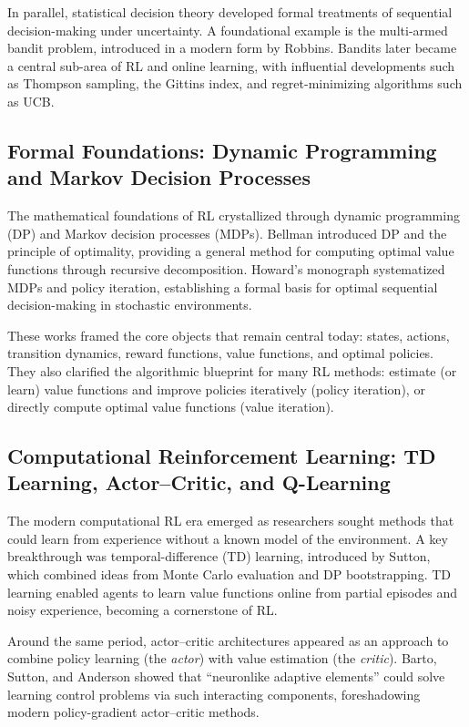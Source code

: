 \documentclass[10pt]{article}
\begin{document}
In parallel, statistical decision theory developed formal treatments of sequential decision-making under uncertainty.
A foundational example is the multi-armed bandit problem, introduced in a modern form by Robbins.\cite{robbins1952sequential}
Bandits later became a central sub-area of RL and online learning, with influential developments such as Thompson sampling,\cite{thompson1933likelihood}
the Gittins index,\cite{gittins1979bandit}
and regret-minimizing algorithms such as UCB.\cite{auer2002finite}

\subsection{Formal Foundations: Dynamic Programming and Markov Decision Processes}

The mathematical foundations of RL crystallized through dynamic programming (DP) and Markov decision processes (MDPs).
Bellman introduced DP and the principle of optimality, providing a general method for computing optimal value functions through recursive decomposition.\cite{bellman1957dynamic}
Howard’s monograph systematized MDPs and policy iteration, establishing a formal basis for optimal sequential decision-making in stochastic environments.\cite{howard1960dynamic}

These works framed the core objects that remain central today: states, actions, transition dynamics, reward functions, value functions, and optimal policies.
They also clarified the algorithmic blueprint for many RL methods: estimate (or learn) value functions and improve policies iteratively (policy iteration), or directly compute optimal value functions (value iteration).\cite{bellman1957dynamic,howard1960dynamic}

\subsection{Computational Reinforcement Learning: TD Learning, Actor--Critic, and Q-Learning}

The modern computational RL era emerged as researchers sought methods that could learn from experience without a known model of the environment.
A key breakthrough was temporal-difference (TD) learning, introduced by Sutton, which combined ideas from Monte Carlo evaluation and DP bootstrapping.\cite{sutton1988td}
TD learning enabled agents to learn value functions online from partial episodes and noisy experience, becoming a cornerstone of RL.

Around the same period, actor--critic architectures appeared as an approach to combine policy learning (the \emph{actor}) with value estimation (the \emph{critic}).
Barto, Sutton, and Anderson showed that ``neuronlike adaptive elements'' could solve learning control problems via such interacting components, foreshadowing modern policy-gradient actor--critic methods.\cite{barto1983neuronlike}
\end{document}
